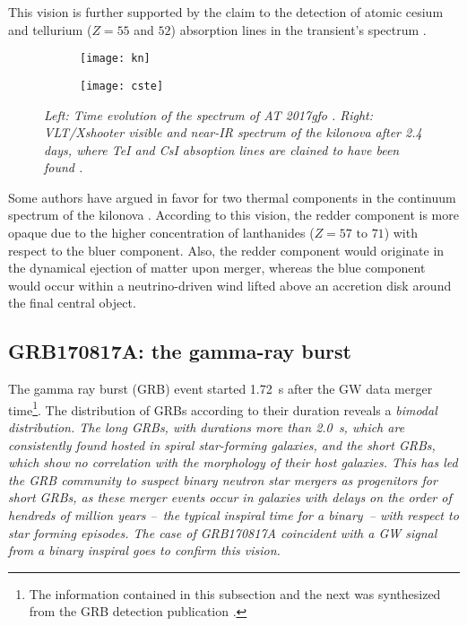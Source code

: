 This vision is further supported by the claim to the detection of atomic cesium and tellurium ($Z = 55$ and $52$) absorption lines in the transient's spectrum \citep{53}.

\begin{figure}
    \centering
    \begin{subfigure}
        \centering
        \texttt{[image: kn]}
    \end{subfigure}
    \begin{subfigure}
        \centering
        \texttt{[image: cste]}
    \end{subfigure}
    \caption{\it{Left:} Time evolution of the spectrum of AT 2017gfo \citep{38}. \it{Right:} VLT/Xshooter visible and near-IR spectrum of the kilonova after 2.4 days, where TeI and CsI absoption lines are clained to have been found \citep{53}.}
    \label{kn}
\end{figure}

Some authors have argued in favor for two thermal components in the continuum spectrum of the kilonova \citep{57}. According to this vision, the redder component is more opaque due to the higher concentration of lanthanides ($Z = 57 \text{ to } 71$) with respect to the bluer component. Also, the redder component would originate in the dynamical ejection of matter upon merger, whereas the blue component would occur within a neutrino-driven wind lifted above an accretion disk around the final central object.


\subsection{GRB170817A: the gamma-ray burst}
The gamma ray burst (GRB) event started 1.72~s after the GW data merger time\footnote{The information contained in this subsection and the next was synthesized from the GRB detection publication \citep{52}.}. The distribution of GRBs according to their duration reveals a \it{bimodal distribution}. The \it{long} GRBs, with durations more than 2.0~s, which are consistently found hosted in spiral star-forming galaxies, and the \it{short} GRBs, which show no correlation with the morphology of their host galaxies. This has led the GRB community to suspect binary neutron star mergers as progenitors for short GRBs, as these merger events occur in galaxies with delays on the order of hendreds of million years --~the typical inspiral time for a binary~-- with respect to star forming episodes. The case of GRB170817A coincident with a GW signal from a binary inspiral goes to confirm this vision.

